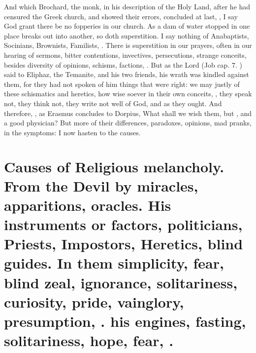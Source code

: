 {And which Brochard, the monk, in his description of the Holy
Land, after he had censured the Greek church, and showed their errors,
concluded at last, ,
I say God grant there be no fopperies in our church. As a dam of water
stopped in one place breaks out into another, so doth superstition. I
say nothing of Anabaptists, Socinians, Brownists, Familists, \etc{}. There
is superstition in our prayers, often in our hearing of sermons, bitter
contentions, invectives, persecutions, strange conceits, besides
diversity of opinions, schisms, factions, \etc{}. But as the Lord (Job
 cap. 7. ) said to Eliphaz, the Temanite, and his two friends,
his wrath was kindled against them, for they had not spoken of him
things that were right: we may justly of these schismatics and
heretics, how wise soever in their own conceits, , they speak not, they think not, they write not well of God, and as
they ought. And therefore, , as Erasmus concludes
to Dorpius,  What shall we wish them, but
, and a good physician? But more of their differences,
paradoxes, opinions, mad pranks, in the symptoms: I now hasten to the
causes.

\section[Causes of Religious melancholy]{Causes of Religious melancholy. From the Devil by miracles, apparitions, oracles. His instruments or factors, politicians, Priests, Impostors, Heretics, blind guides. In them simplicity, fear, blind zeal, ignorance, solitariness, curiosity, pride, vainglory, presumption, \etc{}. his engines, fasting, solitariness, hope, fear, \etc{}.}

}
